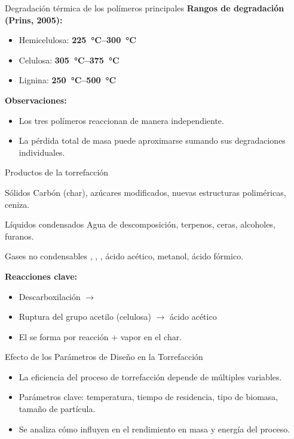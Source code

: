 \documentclass[main.tex]{subfiles}
\begin{document}
\begin{frame}{Degradación térmica de los polímeros principales}
\textbf{Rangos de degradación (Prins, 2005):}
\begin{itemize}
  \item Hemicelulosa: \textbf{\SIrange{225}{300}{\celsius}}
  \item Celulosa: \textbf{\SIrange{305}{375}{\celsius}}
  \item Lignina: \textbf{\SIrange{250}{500}{\celsius}}
\end{itemize}

\vspace{0.5em}
\textbf{Observaciones:}
\begin{itemize}
  \item Los tres polímeros reaccionan de manera independiente.
  \item La pérdida total de masa puede aproximarse sumando sus degradaciones individuales.
\end{itemize}
\end{frame}

\begin{frame}{Productos de la torrefacción}
\begin{block}{Sólidos}
  Carbón (char), azúcares modificados, nuevas estructuras poliméricas, ceniza.
\end{block}

\begin{block}{Líquidos condensados}
  Agua de descomposición, terpenos, ceras, alcoholes, furanos.
\end{block}

\begin{block}{Gases no condensables}
  , , , ácido acético, metanol, ácido fórmico.
\end{block}

\vspace{0.5em}
\textbf{Reacciones clave:}
\begin{itemize}
  \item Descarboxilación $\rightarrow$ 
  \item Ruptura del grupo acetilo (celulosa) $\rightarrow$ ácido acético
  \item El  se forma por reacción  + vapor en el char.
\end{itemize}
\end{frame}

\begin{frame}{Efecto de los Parámetros de Diseño en la Torrefacción}
\begin{itemize}
  \item La eficiencia del proceso de torrefacción depende de múltiples variables.
  \item Parámetros clave: temperatura, tiempo de residencia, tipo de biomasa, tamaño de partícula.
  \item Se analiza cómo influyen en el rendimiento en masa y energía del proceso.
\end{itemize}
\end{frame}
\end{document}
